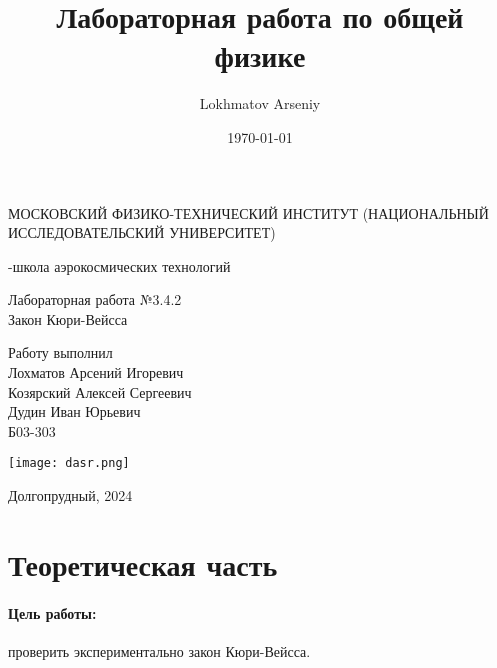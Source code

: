 \documentclass[a4paper,12pt]{article} %
\author{Lokhmatov Arseniy}
\title{Лабораторная работа по общей физике}
\date{\today}
\begin{document}
\begin{titlepage}
    \newpage
    \begin{center}
    {\large МОСКОВСКИЙ ФИЗИКО-ТЕХНИЧЕСКИЙ ИНСТИТУТ (НАЦИОНАЛЬНЫЙ ИССЛЕДОВАТЕЛЬСКИЙ УНИВЕРСИТЕТ)}
    \vspace{1cm}

    {-школа аэрокосмических технологий}
    \vspace{6em}
    \end{center}
    
    \vspace{1.2em}

    \begin{center}
    \Large Лабораторная работа №3.4.2 \\
    Закон Кюри-Вейсса 
    \linebreak
    \end{center}
    
    \vspace{11em}
    
    \begin{flushright}
                       {\large Работу выполнил\\
                       Лохматов Арсений Игоревич\\
                       Козярский Алексей Сергеевич\\
                       Дудин Иван Юрьевич\\
                       Б03-303 }
    \end{flushright}

    \vspace{\fill}

    \begin{center}
        \texttt{[image: dasr.png]}
    \end{center}

    \begin{center}
    Долгопрудный, 2024
    \end{center}

    \end{titlepage}

\section{Теоретическая часть}

\paragraph{Цель работы:} проверить экспериментально закон Кюри-Вейсса.
\end{document}
